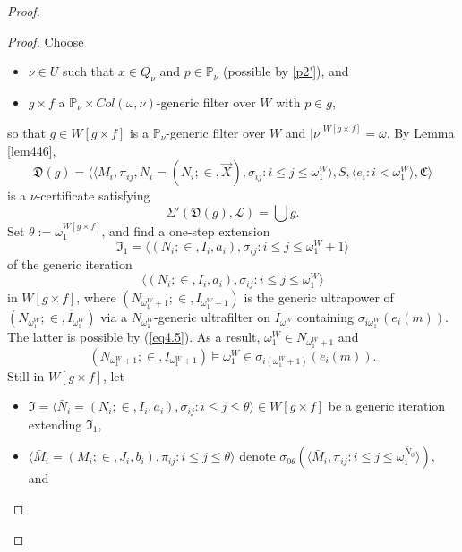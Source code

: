 \documentclass[12pt]{article}
\numberwithin{equation}{section}
\begin{document}
\begin{proof}
\begin{proof}
Choose 
\begin{itemize}
    \item $\nu \in U$ such that $x \in Q_{\nu}$ and $p \in \mathbb{P}_{\nu}$ (possible by \ref{p2'}), and
    \item $g \times f$ a $\mathbb{P}_{\nu} \times Col(\omega, \nu)$-generic filter over $W$ with $p \in g$,
\end{itemize}
so that $g \in W[g \times f]$ is a $\mathbb{P}_{\nu}$-generic filter over $W$ and $|\nu|^{W[g \times f]} = \omega$. By Lemma \ref{lem446}, 
\begin{equation*}
    \mathfrak{D}(g) = \langle \langle \bar{M}_i, \pi_{ij}, \bar{N}_i = (N_i; \in, \Vec{X}), \sigma_{ij} : i \leq j \leq \omega_1^{W} \rangle, S, \langle e_i : i < \omega_1^W \rangle, \mathfrak{C} \rangle
\end{equation*}
is a $\nu$-certificate satisfying
\begin{equation*}
    \Sigma'(\mathfrak{D}(g), \mathcal{L}) = \bigcup g \text{.}
\end{equation*}
Set $\theta := \omega_1^{W[g \times f]}$, and find a one-step extension 
\begin{equation*}
    \mathfrak{I}_1 = \langle (N_i; \in, I_i, a_i), \sigma_{ij} : i \leq j \leq \omega_1^{W} + 1 \rangle
\end{equation*}  
of the generic iteration 
\begin{equation*}
    \langle (N_i; \in, I_i, a_i), \sigma_{ij} : i \leq j \leq \omega_1^{W} \rangle
\end{equation*}
in $W[g \times f]$, where $(N_{\omega_1^W + 1}; \in, I_{\omega_1^W + 1})$ is the generic ultrapower of $(N_{\omega_1^W}; \in, I_{\omega_1^W})$ via a $N_{\omega_1^W}$-generic ultrafilter on $I_{\omega_1^W}$ containing $\sigma_{i\omega_1^W}(e_i(m))$. The latter is possible by (\ref{eq4.5}). As a result, $\omega_1^W \in N_{\omega_1^W + 1}$ and
\begin{equation}\label{eq4.6}
    (N_{\omega_1^W + 1}; \in, I_{\omega_1^W + 1}) \models \omega_1^W \in \sigma_{i(\omega_1^W + 1)}(e_i(m)) \text{.}
\end{equation}
Still in $W[g \times f]$, let 
\begin{itemize}
    \item $\mathfrak{I} = \langle \bar{N}_i = (N_i; \in, I_i, a_i), \sigma_{ij} : i \leq j \leq \theta \rangle \in W[g \times f]$ be a generic iteration extending $\mathfrak{I}_1$,
    \item $\langle \bar{M}_i = (M_i; \in, J_i, b_i), \pi_{ij} : i \leq j \leq \theta \rangle$ denote $\sigma_{0\theta}(\langle \bar{M}_i, \pi_{ij} : i \leq j \leq \omega_1^{\bar{N}_0} \rangle)$, and

\end{itemize}
\end{proof}
\end{proof}
\end{document}
